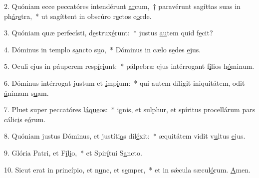 2. Quóniam ecce peccatóres intendérunt \uline{ar}cum,~† paravérunt sagíttas suas in ph\uline{á}r\uline{e}tra,~* ut sagíttent in obscúro r\uline{e}ctos c\uline{o}rde.\par 
3. Quóniam quæ perfecísti, d\uline{e}strux\uline{é}runt:~* justus \uline{au}tem quid f\uline{e}cit?\par 
4. Dóminus in templo s\uline{a}ncto s\uline{u}o,~* Dóminus in cælo s\uline{e}des \uline{e}jus.\par 
5. Oculi ejus in páuperem resp\uline{í}c\uline{i}unt:~* pálpebræ ejus intérrogant f\uline{í}lios h\uline{ó}minum.\par 
6. Dóminus intérrogat justum et \uline{í}mp\uline{i}um:~* qui autem díligit iniquitátem, odit \uline{á}nimam s\uline{u}am.\par 
7. Pluet super peccatóres l\uline{á}\uline{que}os:~* ignis, et sulphur, et spíritus procellárum pars cálic\uline{i}s e\uline{ó}rum.\par 
8. Quóniam justus Dóminus, et justíti\uline{a}s dil\uline{é}xit:~* æquitátem vidit v\uline{u}ltus \uline{e}jus.\par 
9. Glória Patri, et F\uline{í}l\uline{i}o,~* et Spir\uline{í}tui S\uline{a}ncto.\par 
10. Sicut erat in princípio, et n\uline{u}nc, et s\uline{e}mper,~* et in sǽcula sæcul\uline{ó}rum. \uline{A}men.\par 
